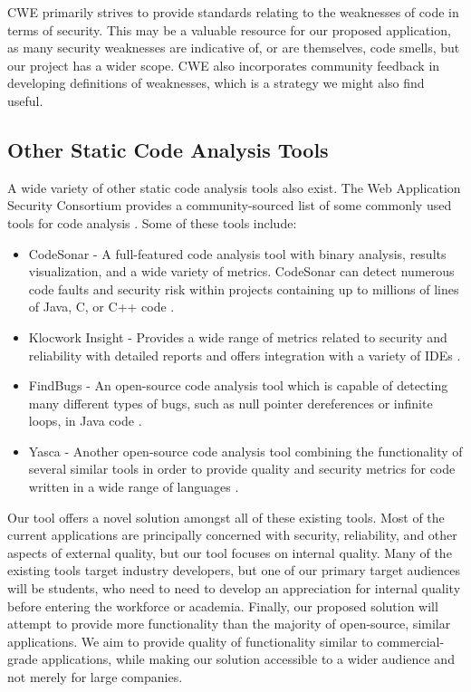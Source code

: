 \documentclass{sig-alternate}
\begin{document}
CWE primarily strives to provide standards relating to the weaknesses of code in terms of security. This may be a valuable resource for our proposed application, as many security weaknesses are indicative of, or are themselves, code smells, but our project has a wider scope. CWE also incorporates community feedback in developing definitions of weaknesses, which is a strategy we might also find useful.

\subsection{Other Static Code Analysis Tools}
A wide variety of other static code analysis tools also exist. The Web Application Security Consortium provides a community-sourced list of some commonly used tools for code analysis \cite{webappsec2012}. Some of these tools include:

\begin{itemize}
\item CodeSonar - A full-featured code analysis tool with binary analysis, results visualization, and a wide variety of metrics. CodeSonar can detect numerous code faults and security risk within projects containing up to millions of lines of Java, C, or C++ code \cite{grammatech2013codesonar}.
\item Klocwork Insight - Provides a wide range of metrics related to security and reliability with detailed reports and offers integration with a variety of IDEs \cite{klocwork2013insight}.
\item FindBugs - An open-source code analysis tool which is capable of detecting many different types of bugs, such as null pointer dereferences or infinite loops, in Java code \cite{pugh2013findbugs}.
\item Yasca - Another open-source code analysis tool combining the functionality of several similar tools in order to provide quality and security metrics for code written in a wide range of languages \cite{scovetta2007yasca}.
\end{itemize}

Our tool offers a novel solution amongst all of these existing tools. Most of the current applications are principally concerned with security, reliability, and other aspects of external quality, but our tool focuses on internal quality. Many of the existing tools target industry developers, but one of our primary target audiences will be students, who need to need to develop an appreciation for internal quality before entering the workforce or academia. Finally, our proposed solution will attempt to provide more functionality than the majority of open-source, similar applications. We aim to provide quality of functionality similar to commercial-grade applications, while making our solution accessible to a wider audience and not merely for large companies. 
\end{document}
